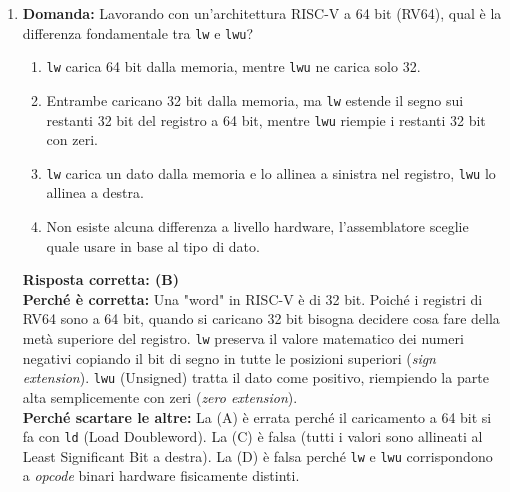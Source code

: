 \documentclass[12pt, a4paper]{article}
\begin{document}
\begin{enumerate}
    \item \textbf{Domanda:} Lavorando con un'architettura RISC-V a 64 bit (RV64), qual è la differenza fondamentale tra \texttt{lw} e \texttt{lwu}?
    \begin{enumerate}[label=(\Alph*)]
        \item \texttt{lw} carica 64 bit dalla memoria, mentre \texttt{lwu} ne carica solo 32.
        \item Entrambe caricano 32 bit dalla memoria, ma \texttt{lw} estende il segno sui restanti 32 bit del registro a 64 bit, mentre \texttt{lwu} riempie i restanti 32 bit con zeri.
        \item \texttt{lw} carica un dato dalla memoria e lo allinea a sinistra nel registro, \texttt{lwu} lo allinea a destra.
        \item Non esiste alcuna differenza a livello hardware, l'assemblatore sceglie quale usare in base al tipo di dato.
    \end{enumerate}
    \textbf{Risposta corretta: (B)} \\
    \textbf{Perché è corretta:} Una "word" in RISC-V è di 32 bit. Poiché i registri di RV64 sono a 64 bit, quando si caricano 32 bit bisogna decidere cosa fare della metà superiore del registro. \texttt{lw} preserva il valore matematico dei numeri negativi copiando il bit di segno in tutte le posizioni superiori (\textit{sign extension}). \texttt{lwu} (Unsigned) tratta il dato come positivo, riempiendo la parte alta semplicemente con zeri (\textit{zero extension}). \\
    \textbf{Perché scartare le altre:} La (A) è errata perché il caricamento a 64 bit si fa con \texttt{ld} (Load Doubleword). La (C) è falsa (tutti i valori sono allineati al Least Significant Bit a destra). La (D) è falsa perché \texttt{lw} e \texttt{lwu} corrispondono a \textit{opcode} binari hardware fisicamente distinti.


\end{enumerate}
\end{document}
